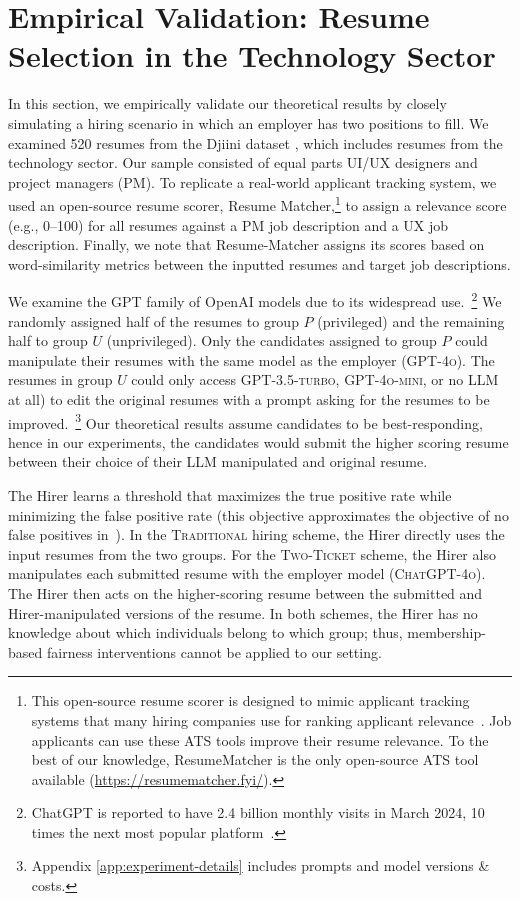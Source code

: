 \section{Empirical Validation: Resume Selection in the Technology Sector}
\label{sec: empirical experiments}
   In this section, we empirically validate our theoretical results by closely simulating a hiring scenario in which an employer has two positions to fill. We examined 520 resumes from the Djiini dataset \citep{drushchak-romanyshyn-2024-introducing}, which includes resumes from the technology sector. Our sample consisted of equal parts UI/UX designers and project managers (PM). To replicate a real-world applicant tracking system, we used an open-source resume scorer, Resume Matcher,\footnote{This open-source resume scorer is designed to mimic applicant tracking systems that many hiring companies use for ranking applicant relevance~\citep{jobscan2025}. Job applicants can use these ATS tools improve their resume relevance. To the best of our knowledge, ResumeMatcher is the only open-source ATS tool available (\url{https://resumematcher.fyi/}).} to assign a relevance score (e.g., 0--100) for all resumes against a PM job description and a UX job description. Finally, we note that Resume-Matcher assigns its scores based on word-similarity metrics between the inputted resumes and target job descriptions.

    We examine the GPT family of OpenAI models due to its widespread use.~\footnote{ChatGPT is reported to have 2.4 billion monthly visits in March 2024, 10 times the next most popular platform~\citep{zhu2024ranked}.} We randomly assigned half of the resumes to group \(P\) (privileged) and the remaining half to group \(U\) (unprivileged). Only the candidates assigned to group \(P\) could manipulate their resumes with the same model as the employer (\textsc{GPT-4o}). The resumes in group \(U\) could only access \textsc{GPT-3.5-turbo}, \textsc{GPT-4o-mini}, or no LLM at all) to edit the original resumes with a prompt asking for the resumes to be improved.~\footnote{Appendix \ref{app:experiment-details} includes prompts and model versions \& costs.} Our theoretical results assume candidates to be best-responding, hence in our experiments, the candidates would submit the higher scoring resume between their choice of their LLM manipulated and original resume.  
    
    The Hirer learns a threshold that maximizes the true positive rate while minimizing the false positive rate (this objective approximates the objective of no false positives in~). In the \textsc{Traditional} hiring scheme, the Hirer directly uses the input resumes from the two groups. For the \textsc{Two-Ticket} scheme, the Hirer also manipulates each submitted resume with the employer model (\textsc{ChatGPT-4o}). The Hirer then acts on the higher-scoring resume between the submitted and Hirer-manipulated versions of the resume. In both schemes, the Hirer has no knowledge about which individuals belong to which group; thus, membership-based fairness interventions cannot be applied to our setting. 

